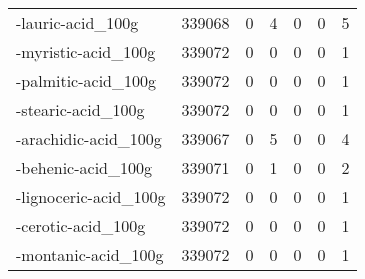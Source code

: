 \begin{tabular}{lrrrrrr}
-lauric-acid\_100g                          &                                        339068 &                                         0 &                                             4 &                                         0 &                      0 &                5 \\
-myristic-acid\_100g                        &                                        339072 &                                         0 &                                             0 &                                         0 &                      0 &                1 \\
-palmitic-acid\_100g                        &                                        339072 &                                         0 &                                             0 &                                         0 &                      0 &                1 \\
-stearic-acid\_100g                         &                                        339072 &                                         0 &                                             0 &                                         0 &                      0 &                1 \\
-arachidic-acid\_100g                       &                                        339067 &                                         0 &                                             5 &                                         0 &                      0 &                4 \\
-behenic-acid\_100g                         &                                        339071 &                                         0 &                                             1 &                                         0 &                      0 &                2 \\
-lignoceric-acid\_100g                      &                                        339072 &                                         0 &                                             0 &                                         0 &                      0 &                1 \\
-cerotic-acid\_100g                         &                                        339072 &                                         0 &                                             0 &                                         0 &                      0 &                1 \\
-montanic-acid\_100g                        &                                        339072 &                                         0 &                                             0 &                                         0 &                      0 &                1 \\

\end{tabular}

